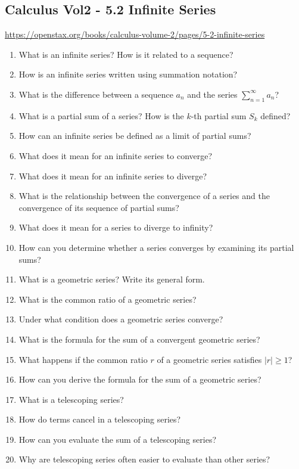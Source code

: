 \subsection{Calculus Vol2 - 5.2 Infinite Series}

\url{https://openstax.org/books/calculus-volume-2/pages/5-2-infinite-series}

\begin{enumerate}
  \item What is an infinite series? How is it related to a sequence?
  \item How is an infinite series written using summation notation?
  \item What is the difference between a sequence ${a_n}$ and the series $\sum_{n=1}^{\infty} a_n$?
  \item What is a partial sum of a series? How is the $k$-th partial sum $S_k$ defined?
  \item How can an infinite series be defined as a limit of partial sums?
  \item What does it mean for an infinite series to converge?
  \item What does it mean for an infinite series to diverge?
  \item What is the relationship between the convergence of a series and the convergence of its sequence of partial sums?
  \item What does it mean for a series to diverge to infinity?
  \item How can you determine whether a series converges by examining its partial sums?
  \item What is a geometric series? Write its general form.
  \item What is the common ratio of a geometric series?
  \item Under what condition does a geometric series converge?
  \item What is the formula for the sum of a convergent geometric series?
  \item What happens if the common ratio $r$ of a geometric series satisfies $|r| \geq 1$?
  \item How can you derive the formula for the sum of a geometric series?
  \item What is a telescoping series?
  \item How do terms cancel in a telescoping series?
  \item How can you evaluate the sum of a telescoping series?
  \item Why are telescoping series often easier to evaluate than other series?

\end{enumerate}
